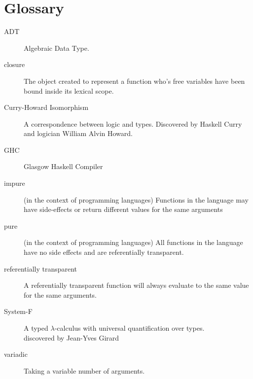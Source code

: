 \documentclass[]{article}
\begin{document}
\section{Glossary}
\begin{description}
\item[ADT] Algebraic Data Type.
\item[closure]
  The object created to represent a function who's free variables have been
  bound inside its lexical scope.
\item[Curry-Howard Isomorphism]
  A correspondence between logic and types.
  Discovered by Haskell Curry and logician William Alvin Howard.
\item[GHC] Glasgow Haskell Compiler
\item[impure] (in the context of programming languages)
  Functions in the language may have side-effects or
  return different values for the same arguments
\item[pure] (in the context of programming languages)
  All functions in the language have no side effects
  and are referentially transparent.
\item[referentially transparent] A referentially transparent function will always
  evaluate to the same value for the same arguments.
\item[System-F]
  A typed $\lambda$-calculus with universal quantification over types.\\
  discovered by Jean-Yves Girard
\item[variadic] Taking a variable number of arguments.
\end{description}

%



\end{document}
